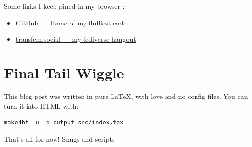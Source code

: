 \documentclass{article}
\begin{document}
Some links I keep pined in my browser :

\begin{itemize}
  \item \href{https://github.com/Jaggernaute}{GitHub — Home of my fluffiest code}
  \item \href{https://transfem.social/@jaggi}{transfem.social — my fediverse hangout}
\end{itemize}

\section*{Final Tail Wiggle}

This blog post was written in pure LaTeX, with love and no config files. You can turn it into HTML with:

\begin{verbatim}
make4ht -u -d output src/index.tex
\end{verbatim}

That’s all for now! Snugs and scripts
\end{document}
